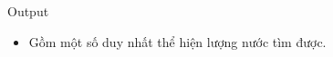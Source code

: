 Output
\begin{itemize}
	\item     Gồm một số duy nhất thể hiện lượng nước tìm được.   
\end{itemize}